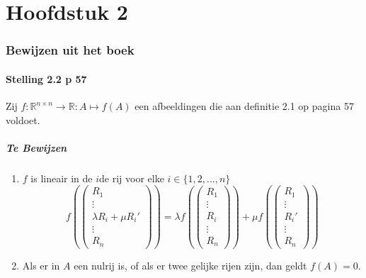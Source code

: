 \documentclass[lineaire_algebra_oplossingen.tex]{subfiles}
\begin{document}
\newpage
\part{Hoofdstuk 2}
\section{Bewijzen uit het boek}
\subsection{Stelling 2.2 p 57}
Zij $f : \mathbb{R}^{n\times n} \rightarrow \mathbb{R}:A\mapsto f(A)$ een afbeeldingen die aan definitie 2.1 op pagina 57 voldoet.
\subsubsection*{Te Bewijzen}
\begin{enumerate}
\item $f$ is lineair in de $i$de rij voor elke $i\in \{1,2,...,n\}$
\[
f\left(
\begin{pmatrix}
R_1 \\ \vdots \\ \lambda R_i + \mu R_i' \\ \vdots \\R_n
\end{pmatrix}
\right)
=
\lambda
f\left(
\begin{pmatrix}
R_1 \\ \vdots \\ R_i\\\vdots \\R_n
\end{pmatrix}
\right)
+
\mu 
f
\left(
\begin{pmatrix}
R_1 \\ \vdots \\ R_i' \\\vdots \\R_n
\end{pmatrix}
\right)
\] 
\item Als er in $A$ een nulrij is, of als er twee gelijke rijen zijn, dan geldt $f(A)=0$.
\end{enumerate}
\end{document}
